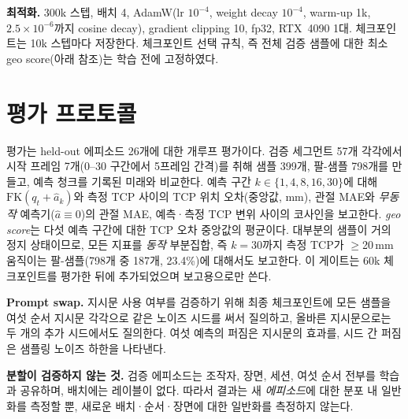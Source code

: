 \documentclass[conference,10pt]{IEEEtran}
\newcommand{\mm}{\,mm\xspace}
\begin{document}
\textbf{최적화.} 300k 스텝, 배치 4, AdamW(lr $10^{-4}$, weight decay $10^{-4}$, warm-up 1k, $2.5\times10^{-6}$까지 cosine decay),
gradient clipping 10, fp32, RTX~4090 1대. 체크포인트는 10k 스텝마다 저장한다. 체크포인트 선택 규칙, 즉 전체 검증 샘플에 대한
최소 geo score(아래 참조)는 학습 전에 고정하였다.

\section{평가 프로토콜}\label{sec:eval}
평가는 held-out 에피소드 26개에 대한 개루프 평가이다. 검증 세그먼트 57개 각각에서 시작 프레임 7개(0--30 구간에서 5프레임 간격)를
취해 샘플 399개, 팔-샘플 798개를 만들고, 예측 청크를 기록된 미래와 비교한다. 예측 구간 $k\in\{1,4,8,16,30\}$에 대해
$\mathrm{FK}(q_t+\hat a_k)$와 측정 TCP 사이의 TCP 위치 오차(중앙값, mm), 관절 MAE와 \emph{무동작} 예측기($\hat a\equiv0$)의 관절
MAE, 예측·측정 TCP 변위 사이의 코사인을 보고한다. \emph{geo score}는 다섯 예측 구간에 대한 TCP 오차 중앙값의 평균이다. 대부분의
샘플이 거의 정지 상태이므로, 모든 지표를 \emph{동작} 부분집합, 즉 $k{=}30$까지 측정 TCP가 $\ge$20\mm 움직이는 팔-샘플(798개 중
187개, 23.4\%)에 대해서도 보고한다. 이 게이트는 60k 체크포인트를 평가한 뒤에 추가되었으며 보고용으로만 쓴다.

\textbf{Prompt swap.} 지시문 사용 여부를 검증하기 위해 최종 체크포인트에 모든 샘플을 여섯 순서 지시문 각각으로 같은 노이즈 시드를
써서 질의하고, 올바른 지시문으로는 두 개의 추가 시드에서도 질의한다. 여섯 예측의 퍼짐은 지시문의 효과를, 시드 간 퍼짐은 샘플링
노이즈 하한을 나타낸다.

\textbf{분할이 검증하지 않는 것.} 검증 에피소드는 조작자, 장면, 세션, 여섯 순서 전부를 학습과 공유하며, 배치에는 레이블이 없다.
따라서 결과는 새 \emph{에피소드}에 대한 분포 내 일반화를 측정할 뿐, 새로운 배치·순서·장면에 대한 일반화를 측정하지 않는다.
\end{document}
